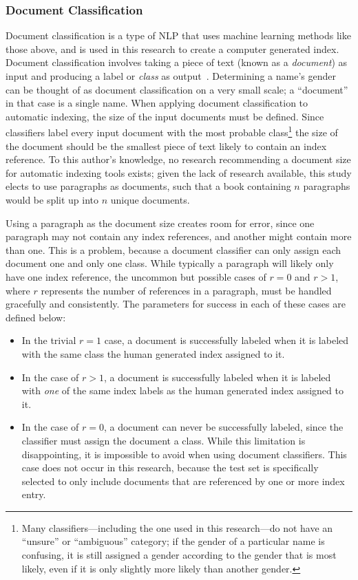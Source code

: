 \subsubsection{Document Classification}
\label{sec:doc-class}
Document classification is a type of NLP that uses machine learning methods like those above, and is used in this research to create a computer generated index.
Document classification involves taking a piece of text (known as a {\it document}) as input and producing a label or {\it class} as output~\cite{jurafsky}.
Determining a name's gender can be thought of as document classification on a very small scale; a ``document'' in that case is a single name.
When applying document classification to automatic indexing, the size of the input documents must be defined.
Since classifiers label every input document with the most probable class\footnote{Many classifiers---including the one used in this research---do not have an ``unsure'' or ``ambiguous'' category; if the gender of a particular name is confusing, it is still assigned a gender according to the gender that is most likely, even if it is only slightly more likely than another gender.} the size of the document should be the smallest piece of text likely to contain an index reference.
To this author's knowledge, no research recommending a document size for automatic indexing tools exists; given the lack of research available, this study elects to use paragraphs as documents, such that a book containing $n$ paragraphs would be split up into $n$ unique documents.

Using a paragraph as the document size creates room for error, since one paragraph may not contain any index references, and another might contain more than one.
This is a problem, because a document classifier can only assign each document one and only one class.
While typically a paragraph will likely only have one index reference, the uncommon but possible cases of $r = 0$ and $r > 1$, where $r$ represents the number of references in a paragraph, must be handled gracefully and consistently.
The parameters for success in each of these cases are defined below:

\begin{itemize}
\item In the trivial $r = 1$ case, a document is successfully labeled when it is labeled with the same class the human generated index assigned to it.
\item In the case of $r > 1$, a document is successfully labeled when it is labeled with {\it one} of the same index labels as the human generated index assigned to it.
\item In the case of $r = 0$, a document can never be successfully labeled, since the classifier must assign the document a class. While this limitation is disappointing, it is impossible to avoid when using document classifiers. This case does not occur in this research, because the test set is specifically selected to only include documents that are referenced by one or more index entry.
\end{itemize}

